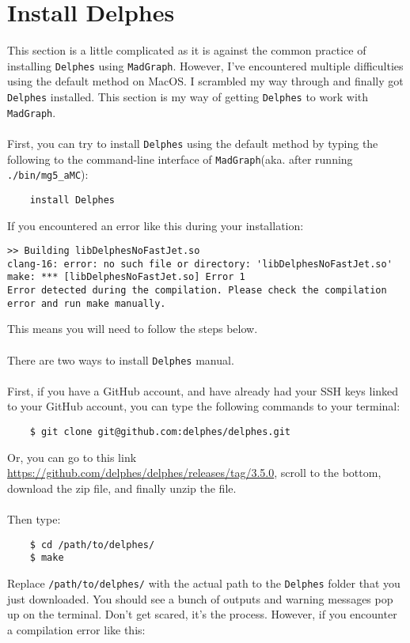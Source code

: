 \documentclass[12pt, english]{article}
\begin{document}
\section{Install Delphes}
This section is a little complicated as it is against the common practice of installing \texttt{Delphes} using \texttt{MadGraph}. However, I've encountered multiple difficulties using the default method on MacOS. I scrambled my way through and finally got \texttt{Delphes} installed. This section is my way of getting \texttt{Delphes} to work with \texttt{MadGraph}. \\\\
First, you can try to install \texttt{Delphes} using the default method by typing the following to the command-line interface of \texttt{MadGraph}(aka. after running \lstinline{./bin/mg5_aMC}):
\begin{lstlisting}
    install Delphes
\end{lstlisting}
If you encountered an error like this during your installation:
\begin{lstlisting}
>> Building libDelphesNoFastJet.so
clang-16: error: no such file or directory: 'libDelphesNoFastJet.so'
make: *** [libDelphesNoFastJet.so] Error 1
Error detected during the compilation. Please check the compilation error and run make manually.
\end{lstlisting}
This means you will need to follow the steps below. \\\\
There are two ways to install \texttt{Delphes} manual. \\\\
First, if you have a GitHub account, and have already had your SSH keys linked to your GitHub account, you can type the following commands to your terminal:
\begin{lstlisting}
    $ git clone git@github.com:delphes/delphes.git
\end{lstlisting}
Or, you can go to this link \url{https://github.com/delphes/delphes/releases/tag/3.5.0}, scroll to the bottom, download the zip file, and finally unzip the file. \\\\
Then type:
\begin{lstlisting}
    $ cd /path/to/delphes/
    $ make
\end{lstlisting}
Replace \lstinline{/path/to/delphes/} with the actual path to the \texttt{Delphes} folder that you just downloaded. 
You should see a bunch of outputs and warning messages pop up on the terminal. Don't get scared, it's the process. However, if you encounter a compilation error like this:
\end{document}
